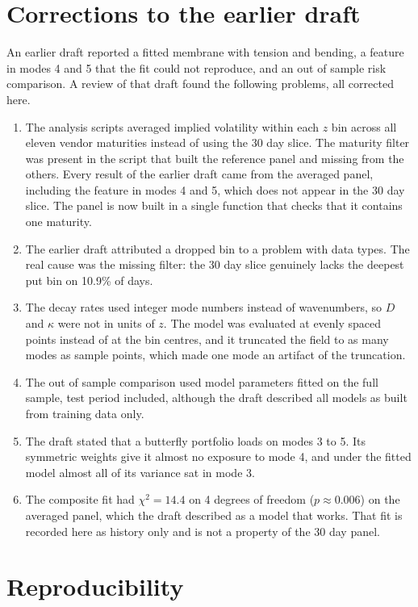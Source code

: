 \documentclass[11pt]{article}
\begin{document}
\section{Corrections to the earlier draft}
\label{app:corrections}

An earlier draft reported a fitted membrane with tension and bending, a feature in modes 4 and 5 that the fit could not reproduce, and an out of sample risk comparison. A review of that draft found the following problems, all corrected here.

\begin{enumerate}
\item The analysis scripts averaged implied volatility within each $z$ bin across all eleven vendor maturities instead of using the 30 day slice. The maturity filter was present in the script that built the reference panel and missing from the others. Every result of the earlier draft came from the averaged panel, including the feature in modes 4 and 5, which does not appear in the 30 day slice. The panel is now built in a single function that checks that it contains one maturity.
\item The earlier draft attributed a dropped bin to a problem with data types. The real cause was the missing filter: the 30 day slice genuinely lacks the deepest put bin on 10.9\% of days.
\item The decay rates used integer mode numbers instead of wavenumbers, so $D$ and $\kappa$ were not in units of $z$. The model was evaluated at evenly spaced points instead of at the bin centres, and it truncated the field to as many modes as sample points, which made one mode an artifact of the truncation.
\item The out of sample comparison used model parameters fitted on the full sample, test period included, although the draft described all models as built from training data only.
\item The draft stated that a butterfly portfolio loads on modes 3 to 5. Its symmetric weights give it almost no exposure to mode 4, and under the fitted model almost all of its variance sat in mode 3.
\item The composite fit had $\chi^2=14.4$ on 4 degrees of freedom ($p\approx0.006$) on the averaged panel, which the draft described as a model that works. That fit is recorded here as history only and is not a property of the 30 day panel.
\end{enumerate}

\section{Reproducibility}
\end{document}

